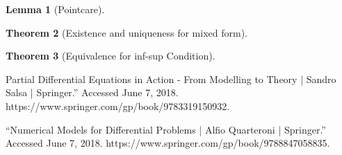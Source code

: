 \documentclass[conference]{IEEEtran}
\newtheorem{theorem}{Theorem}[section]
\newtheorem{lemma}[theorem]{Lemma}
\begin{document}
\begin{lemma}[Pointcare]
\label{th:pointcare}

\end{lemma}

\begin{theorem}[Existence and uniqueness for mixed form]
\label{th:mainTheorem}

\end{theorem}

\begin{theorem}[Equivalence for inf-sup Condition]
\label{th:equivalence}

\end{theorem}

\begin{thebibliography}{1}

Partial Differential Equations in Action - From Modelling to Theory | Sandro Salsa | Springer.” Accessed June 7, 2018. https://www.springer.com/gp/book/9783319150932.

“Numerical Models for Differential Problems | Alfio Quarteroni | Springer.” Accessed June 7, 2018. https://www.springer.com/gp/book/9788847058835.




\end{thebibliography}
\end{document}
